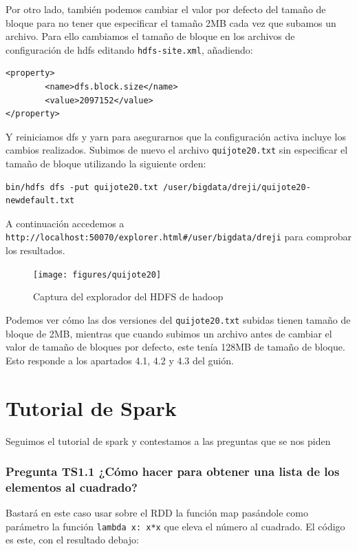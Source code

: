 \documentclass[11pt]{article}
\def\inline{\lstinline[basicstyle=\ttfamily,keywordstyle={}]}
\begin{document}
Por otro lado, también podemos cambiar el valor por defecto del tamaño de bloque para no tener que especificar el tamaño 2MB cada vez que subamos un archivo. Para ello cambiamos el tamaño de bloque en los archivos de configuración de hdfs editando \inline{hdfs-site.xml}, añadiendo:

\begin{verbatim}
<property>
        <name>dfs.block.size</name>
        <value>2097152</value>
</property>
\end{verbatim}

Y reiniciamos dfs y yarn para asegurarnos que la configuración activa incluye los cambios realizados. Subimos de nuevo el archivo \inline{quijote20.txt} sin especificar el tamaño de bloque utilizando la siguiente orden:

\begin{verbatim}
bin/hdfs dfs -put quijote20.txt /user/bigdata/dreji/quijote20-newdefault.txt
\end{verbatim}

A continuación accedemos a \inline{http://localhost:50070/explorer.html#/user/bigdata/dreji} para comprobar los resultados.

\begin{figure}[H]
  \centering
  \texttt{[image: figures/quijote20]}
  \caption{Captura del explorador del HDFS de hadoop}
\end{figure}

Podemos ver cómo las dos versiones del \inline{quijote20.txt} subidas tienen tamaño de bloque de 2MB, mientras que cuando subimos un archivo antes de cambiar el valor de tamaño de bloques por defecto, este tenía 128MB de tamaño de bloque. Esto responde a los apartados 4.1, 4.2 y 4.3 del guión.


\newpage

\section{ Tutorial de Spark}

Seguimos el tutorial de spark y contestamos a las preguntas que se nos piden


\subsubsection*{ Pregunta TS1.1 ¿Cómo hacer para obtener una lista de los elementos al cuadrado?}

Bastará en este caso usar sobre el RDD la función map pasándole como parámetro la función  \inline{lambda x: x*x} que eleva el número al cuadrado. El código es este, con el resultado debajo:
\end{document}
